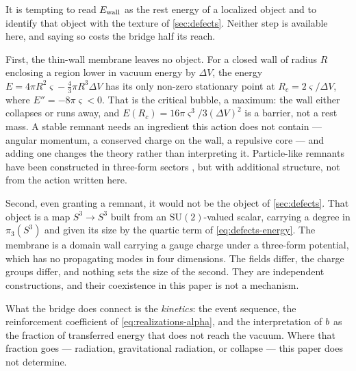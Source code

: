\begin{remark}\label{rem:bridge-limits}
  It is tempting to read $E_{\rm wall}$ as the rest energy of a localized
  object and to identify that object with the texture of \cref{sec:defects}.
  Neither step is available here, and saying so costs the bridge half its
  reach.

  First, the thin-wall membrane leaves no object. For a closed wall of radius
  $R$ enclosing a region lower in vacuum energy by $\Delta V$, the energy
  $E=4\pi R^2\varsigma-\tfrac43\pi R^3\Delta V$ has its only non-zero
  stationary point at $R_c=2\varsigma/\Delta V$, where
  $E''=-8\pi\varsigma<0$. That is the critical bubble, a maximum: the wall
  either collapses or runs away, and $E(R_c)=16\pi\varsigma^3/3(\Delta V)^2$ is
  a barrier, not a rest mass. A stable remnant needs an ingredient this action
  does not contain --- angular momentum, a conserved charge on the wall, a
  repulsive core --- and adding one changes the theory rather than interpreting
  it. Particle-like remnants have been constructed in three-form sectors
  \parencite{khan2026_260403363}, but with additional structure, not from the
  action written here.

  Second, even granting a remnant, it would not be the object of
  \cref{sec:defects}. That object is a map $S^3\to S^3$ built from an
  $\mathrm{SU}(2)$-valued scalar, carrying a degree in $\pi_3(S^3)$ and given
  its size by the quartic term of \cref{eq:defects-energy}. The membrane is a
  domain wall carrying a gauge charge under a three-form potential, which has
  no propagating modes in four dimensions. The fields differ, the charge groups
  differ, and nothing sets the size of the second. They are independent
  constructions, and their coexistence in this paper is not a mechanism.

  What the bridge does connect is the \emph{kinetics}: the event sequence, the
  reinforcement coefficient of \cref{eq:realizations-alpha}, and the
  interpretation of $b$ as the fraction of transferred energy that does
  not reach the vacuum. Where that fraction goes --- radiation, gravitational
  radiation, or collapse --- this paper does not determine.
\end{remark}

